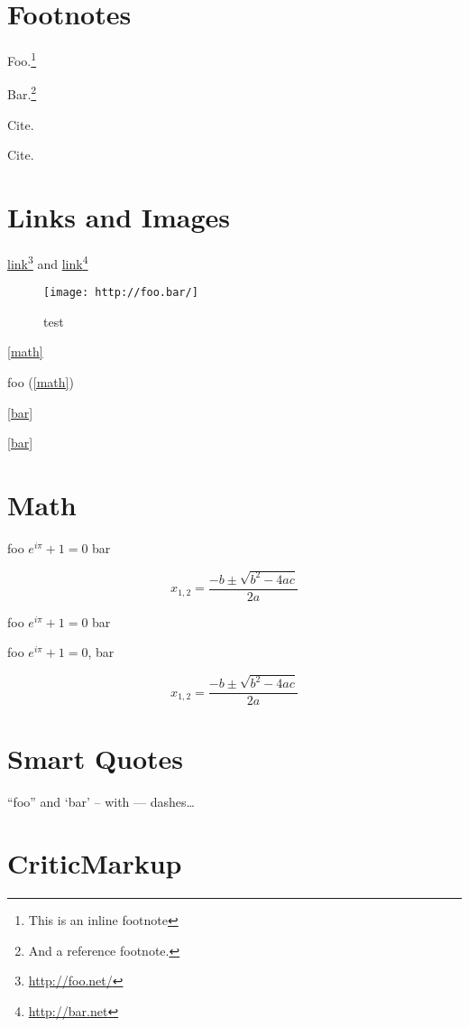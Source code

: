 \part{Footnotes }
\label{footnotes}

Foo.\footnote{This is an inline footnote}

Bar.\footnote{And a reference footnote.}

Cite.~\citep{inlinecitation}

Cite.~\citep{foo}

\part{Links and Images }
\label{linksandimages}

\href{http://foo.net/}{link}\footnote{\href{http://foo.net/}{http:\slash \slash foo.net\slash }} and \href{http://bar.net}{link}\footnote{\href{http://bar.net}{http:\slash \slash bar.net}}

\begin{figure}[htbp]
\centering
\texttt{[image: http://foo.bar/]}
\caption{test}
\end{figure}

\autoref{math}

foo (\autoref{math})

\autoref{bar}

\autoref{bar}

\part{Math }
\label{math}

foo \({e}^{i\pi }+1=0\) bar

\[ {x}_{1,2}=\frac{-b\pm \sqrt{{b}^{2}-4ac}}{2a} \]

foo ${e}^{i\pi }+1=0$ bar

foo ${e}^{i\pi }+1=0$, bar

$${x}_{1,2}=\frac{-b\pm \sqrt{{b}^{2}-4ac}}{2a}$$

\part{Smart Quotes }
\label{smartquotes}

``foo'' and `bar' -- with --- dashes{\ldots}

\part{CriticMarkup }
\label{criticmarkup}

